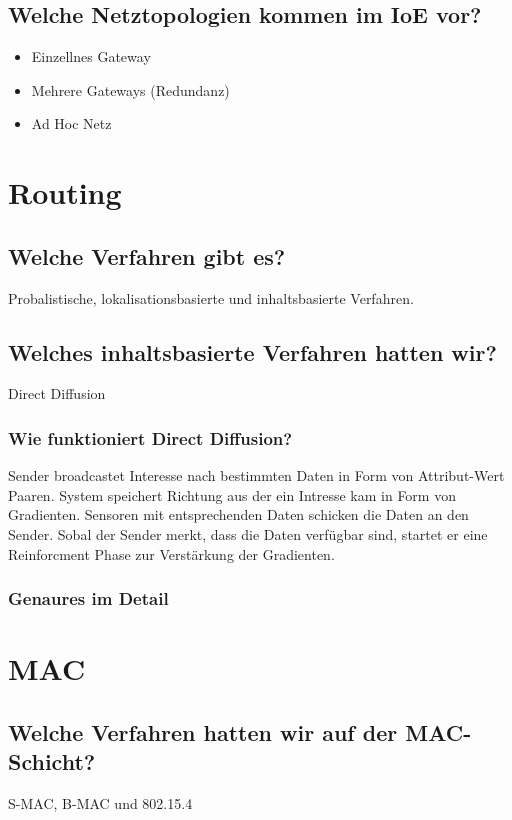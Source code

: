 	\subsection{Welche Netztopologien kommen im IoE vor?}
	\begin{itemize}
		\item Einzellnes Gateway
		\item Mehrere Gateways (Redundanz)
		\item Ad\- Hoc\- Netz
	\end{itemize}
		
\section{Routing}
	\subsection{Welche Verfahren gibt es?}
		Probalistische, lokalisationsbasierte und inhaltsbasierte Verfahren.
		
	\subsection{Welches inhaltsbasierte Verfahren hatten wir?}
		Direct Diffusion
	
	\subsubsection{Wie funktioniert Direct Diffusion?}		
		Sender broadcastet Interesse nach bestimmten Daten in Form von Attribut-Wert Paaren. System speichert Richtung aus der ein Intresse kam in Form von Gradienten. Sensoren mit entsprechenden Daten schicken die Daten an den Sender. Sobal der Sender merkt, dass die Daten verfügbar sind, startet er eine Reinforcment Phase zur Verstärkung der Gradienten.
		\subsubsection{Genaures im Detail } %
		

\section{MAC}
	\subsection{Welche Verfahren hatten wir auf der MAC-Schicht?}
		S-MAC, B-MAC und 802.15.4 
		
